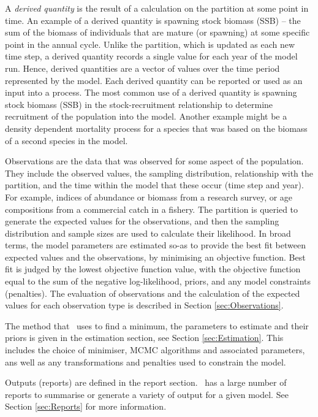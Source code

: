 A \emph{derived quantity} is the result of a calculation on the partition at some point in time. An example of a derived quantity is spawning stock biomass (SSB) -- the sum of the biomass of individuals that are mature (or spawning) at some specific point in the annual cycle. Unlike the partition, which is updated as each new time step, a derived quantity records a single value for each year of the model run. Hence, derived quantities are a vector of values over the time period represented by the model. Each derived quantity can be reported or used as an input into a process. The most common use of a derived quantity is spawning stock biomass (SSB) in the stock-recruitment relationship to determine recruitment of the population into the model. Another example might be a density dependent mortality process for a species that was based on the biomass of a second species in the model.

Observations are the data that was observed for some aspect of the population. They include the observed values, the sampling distribution, relationship with the partition, and the time within the model that these occur (time step and year). For example, indices of abundance or biomass from a research survey, or age compositions from a commercial catch in a fishery. The partition is queried to generate the expected values for the observations, and then the sampling distribution and sample sizes are used to calculate their likelihood. In broad terms, the model parameters are estimated so-as to provide the best fit between expected values and the observations, by minimising an objective function. Best fit is judged by the lowest objective function value, with the objective function equal to the sum of the negative log-likelihood, priors, and any model constraints (penalties). The evaluation of observations and the calculation of the expected values for each observation type is described in Section \ref{sec:Observations}.

The method that \CNAME\ uses to find a minimum, the parameters to estimate and their priors is given in the estimation section, see Section \ref{sec:Estimation}. This includes the choice of minimiser, MCMC algorithms and associated parameters, ans well as any transformations and penalties used to constrain the model.

Outputs (reports) are defined in the report section. \CNAME\  has a large number of reports to summarise or generate a variety of output for a given model. See Section \ref{sec:Reports} for more information.

